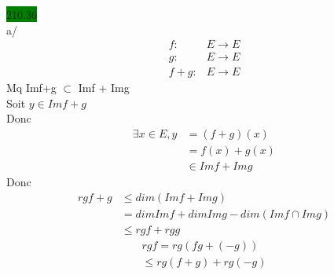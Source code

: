 \documentclass{article}
\begin{document}
\noindent \colorbox{green}{210.36}\\
a/ \begin{align*}
    f:&E\to E\\
    g:&E \to E\\
    f+g:&E\to E
\end{align*}
Mq Imf+g \(\subset\) Imf + Img\\
Soit \(y \in Imf+g\)\\
Donc \begin{align*}
    \exists x \in E, y &= (f+g)(x)\\
    &= f(x) + g(x)\\
    &\in Imf + Img
\end{align*}
Donc \begin{align*}
    rgf+g &\leq dim(Imf + Img)\\
    &= dimImf + dimImg - dim(Imf\cap Img)\\
    &\leq rgf + rgg
\end{align*}
\begin{align*}
    rgf = rg(fg+(-g))\\
    \leq rg(f+g) + rg(-g)
\end{align*}
\end{document}
